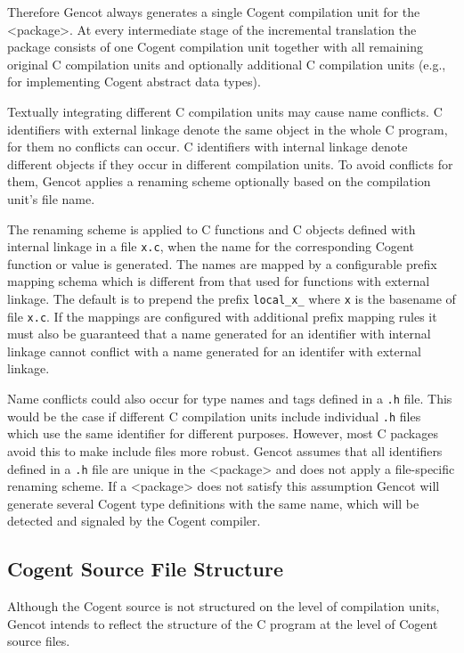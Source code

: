 \documentclass[a4paper]{report}
\newcommand{\code}[1]{\textnormal{\texttt{#1}}}
\begin{document}
Therefore Gencot always generates a single Cogent compilation unit for the <package>. 
At every intermediate stage of the incremental translation the package consists of one Cogent compilation unit 
together with all remaining original C compilation units and optionally additional C compilation units (e.g., for implementing 
Cogent abstract data types).

Textually integrating different C compilation units may cause name conflicts. C identifiers with external linkage denote the same
object in the whole C program, for them no conflicts can occur. C identifiers with internal linkage denote different objects 
if they occur in different compilation units. To avoid conflicts for them, Gencot applies a renaming scheme optionally based on the 
compilation unit's file name.

The renaming scheme is applied to C functions and C objects defined with internal linkage in a file \code{x.c}, when the
name for the corresponding Cogent function or value is generated. The names are mapped by a configurable prefix mapping schema 
which is different from that used for functions with external linkage. The default is to prepend the prefix \code{local\_x\_}
where \code{x} is the basename of file \code{x.c}. If the mappings are configured with additional prefix mapping rules it
must also be guaranteed that a name generated for an identifier with internal linkage cannot conflict with a name generated
for an identifer with external linkage.

Name conflicts could also occur for type names and tags defined in a \code{.h} file. This would be the case if different
C compilation units include individual \code{.h} files which use the same identifier for different purposes. However, most
C packages avoid this to make include files more robust. Gencot assumes that all identifiers defined in a \code{.h} file
are unique in the <package> and does not apply a file-specific renaming scheme. If a <package> does not satisfy this assumption
Gencot will generate several Cogent type definitions with the same name, which will be detected and signaled by the Cogent compiler.

\subsection{Cogent Source File Structure}

Although the Cogent source is not structured on the level of compilation units, Gencot intends to reflect the structure of 
the C program at the level of Cogent source files. 
\end{document}
